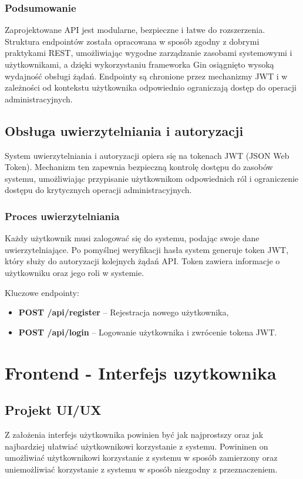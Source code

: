 \subsubsection{Podsumowanie}
Zaprojektowane API jest modularne, bezpieczne i łatwe do rozszerzenia. Struktura endpointów została opracowana w sposób zgodny z dobrymi praktykami REST, umożliwiając wygodne zarządzanie zasobami systemowymi i użytkownikami, a dzięki wykorzystaniu frameworka Gin osiągnięto wysoką wydajność obsługi żądań. Endpointy są chronione przez mechanizmy JWT i w zależności od kontekstu użytkownika odpowiednio ograniczają dostęp do operacji administracyjnych.


\subsection{Obsługa uwierzytelniania i autoryzacji}

System uwierzytelniania i autoryzacji opiera się na tokenach JWT (JSON Web Token). Mechanizm ten zapewnia bezpieczną kontrolę dostępu do zasobów systemu, umożliwiając przypisanie użytkownikom odpowiednich ról i ograniczenie dostępu do krytycznych operacji administracyjnych.

\subsubsection{Proces uwierzytelniania}
Każdy użytkownik musi zalogować się do systemu, podając swoje dane uwierzytelniające. Po pomyślnej weryfikacji hasła system generuje token JWT, który służy do autoryzacji kolejnych żądań API. Token zawiera informacje o użytkowniku oraz jego roli w systemie.

Kluczowe endpointy:
\begin{itemize}
    \item \textbf{POST /api/register} – Rejestracja nowego użytkownika,
    \item \textbf{POST /api/login} – Logowanie użytkownika i zwrócenie tokena JWT.
\end{itemize}
\newpage
\section{Frontend - Interfejs uzytkownika}

\subsection{Projekt UI/UX}

Z założenia interfejs użytkownika powinien być jak najprostszy oraz jak najbardziej ułatwiać użytkownikowi korzystanie z systemu. Powininen on umożliwiać użytkownikowi korzystanie z systemu w sposób zamierzony oraz uniemożliwiać korzystanie z systemu w sposób niezgodny z przeznaczeniem.
